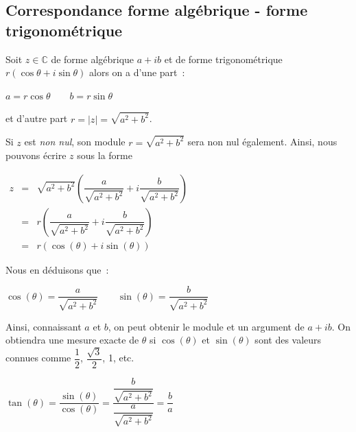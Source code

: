 \documentclass[french]{book}
\newcommand{\bbc}{\mathbb {C}}
\newcommand{\I}{i}
\newcommand{\ofr}[2]{\dfrac{#1}{#2}}
\newcommand{\fr}[2]{\dfrac{#1}{#2}}
\newcommand{\pa}[1]{(#1)}
\newcommand{\cacheg}[1]{#1}
\begin{document}
\subsection{Correspondance forme algébrique - forme trigonométrique} 


Soit  $z\in\bbc$  de   forme  algébrique  $a+ib$  et   de  forme
trigonométrique $r\pa{\cos\theta+i\sin\theta}$ alors on a d'une part~: 


  \begin{prop}
$a=$\cacheg{$r\cos\theta$}$\qquad b=$\cacheg{$r\sin\theta$}    
    \end{prop}
  



et d'autre part $r=|z|=\sqrt{a^2+b^2}$.



Si $z$ est \textit{non nul},  son module $r=\sqrt{a^2+b^2}$ sera non nul
également. Ainsi, nous pouvons écrire $z$ sous la forme 

\begin{center}
$\begin{array}{ccc}
z&=&\sqrt{a^2+b^2}\pa{\fr{a}{\sqrt{a^2+b^2}}+\I\fr{b}{\sqrt{a^2+b^2}}}\\
&=& r\pa{\fr{a}{\sqrt{a^2+b^2}}+\I\fr{b}{\sqrt{a^2+b^2}}}\\
   &=& r\pa{\cos(\theta)+\I\sin(\theta)}
\end{array}$
\end{center}

Nous en déduisons que~:



  \begin{prop}
$\cos(\theta)=$\cacheg{$\fr{a}{\sqrt{a^2+b^2}}$}$\qquad
\sin(\theta)=$\cacheg{$\fr{b}{\sqrt{a^2+b^2}}$} 
    \end{prop}
  




Ainsi, connaissant $a$ et $b$, on  peut obtenir le module et un argument
de  $a+\I   b$.  On   obtiendra  une  mesure   exacte  de   $\theta$  si
$\cos(\theta)$  et   $\sin(\theta)$  sont  des   valeurs  connues  comme
$\ofr{1}{2}$, $\ofr{\sqrt{3}}{2}$, 1, etc. 




  \begin{prop}
$\tan(\theta)=\fr{\sin(\theta)}{\cos(\theta)}=\fr{\fr{b}{\sqrt{a^2+b^2}}}{\fr{a}{\sqrt{a^2+b^2}}}=$\cacheg{$\fr{b}{a}$} 
    \end{prop}
  
\end{document}
